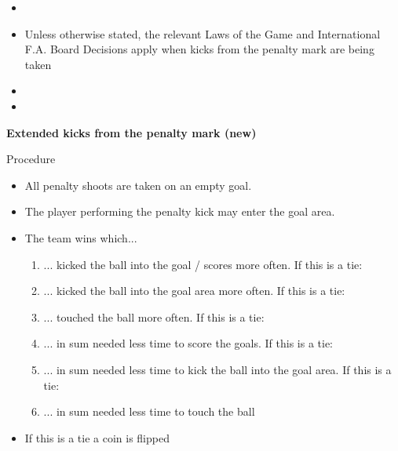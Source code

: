 \begin{itemize}
\item {}
\item Unless otherwise stated, the relevant Laws of the Game and International F.A. Board Decisions apply when kicks from the penalty mark are being taken
\item {}
\item {}
\end{itemize}


{\bfseries Extended kicks from the penalty mark (new) }

\bigskip

Procedure

\headlinebox

\begin{itemize}
\item All penalty shoots are taken on an empty goal.
\item The player performing the penalty kick may enter the goal area.
\item The team wins which...
\begin{enumerate}
\item ... kicked the ball into the goal / scores more often. If this is a tie:
\item ... kicked the ball into the goal area more often. If this is a tie:
\item ... touched the ball more often. If this is a tie:
\item ... in sum needed less time to score the goals. If this is a tie:
\item ... in sum needed less time to kick the ball into the goal area. If this is a tie:
\item ... in sum needed less time to touch the ball
\end{enumerate}
\item If this is a tie a coin is flipped
\end{itemize}
